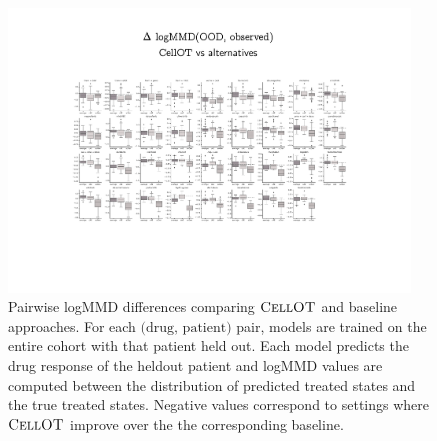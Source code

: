 \begin{figure}
  \begin{center}
    \includegraphics[width=0.95\textwidth]{figures/cellot-cohort/ood-eval-logmmd.pdf}
  \end{center}
  \caption{
    Pairwise logMMD differences comparing $\textsc{CellOT}$ and baseline approaches.
    For each $\text{(drug, patient)}$ pair, models are trained on the entire cohort with that patient held out.
    Each model predicts the drug response of the heldout patient
    and logMMD values are computed between the distribution of predicted treated states and the true treated states.
    Negative values correspond to settings where $\textsc{CellOT}$ improve over the the corresponding baseline.
  }
\label{fig:ood-eval-logmmd}
\end{figure}

